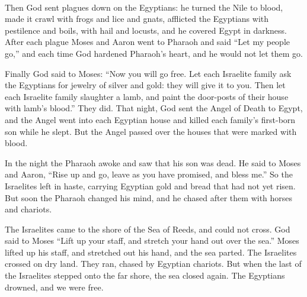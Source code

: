 \documentclass[a4paper,10pt,openany]{memoir}
\newcommand{\HgFill}{\vfill \hrule \vfill}
\newenvironment{HgEnglish}{\strut\\\noindent}{\vspace{1em}}
\begin{document}
\begin{HgEnglish}
  Then God sent plagues down on the Egyptians: 
  he turned the Nile to blood, 
  made it crawl with frogs and lice and gnats, 
  afflicted the Egyptians with pestilence and boils, 
  with hail and locusts, 
  and he covered Egypt in darkness.
  After each plague Moses and Aaron went to Pharaoh 
  and said ``Let my people go,'' 
  and each time God hardened Pharaoh's heart, 
  and he would not let them go.

  Finally God said to Moses: 
  ``Now you will go free.
  Let each Israelite family ask the Egyptians
  for jewelry of silver and gold: 
  they will give it to you.
  Then let each Israelite family slaughter a lamb, 
  and paint the door-posts of their house with lamb's blood.'' 
  They did. 
  That night, God sent the Angel of Death to Egypt, 
  and the Angel went into each Egyptian house 
  and killed each family's first-born son while he slept. 
  But the Angel passed over the houses that were marked with blood.

  In the night the Pharaoh awoke
  and saw that his son was dead. 
  He said to Moses and Aaron,
  ``Rise up and go, leave as you have promised,
  and bless me.''
  So the Israelites left in haste,
  carrying Egyptian gold
  and bread that had not yet risen.
  But soon the Pharaoh changed his mind, 
  and he chased after them with horses and chariots.

  The Israelites came to the shore of the Sea of Reeds, 
  and could not cross. 
  God said to Moses ``Lift up your staff,
  and stretch your hand out over the sea.'' 
  Moses lifted up his staff, 
  and stretched out his hand,
  and the sea parted. 
  The Israelites crossed on dry land. 
  They ran, chased by Egyptian chariots.
  But when the last of the Israelites stepped onto the far shore, 
  the sea closed again.
  The Egyptians drowned, 
  and we were free.
\end{HgEnglish}

%
\end{document}
